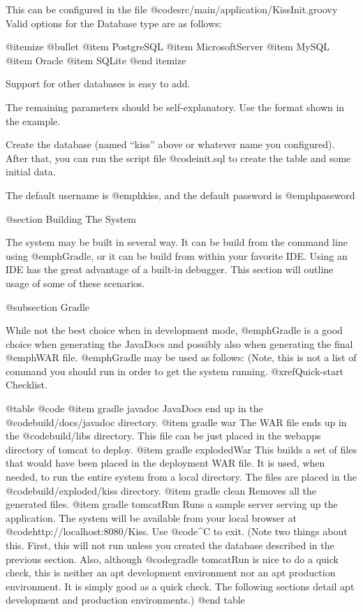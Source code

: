 This can be configured in the file @code{src/main/application/KissInit.groovy}
Valid options for the Database type are as follows:

@itemize @bullet
@item
PostgreSQL
@item
MicrosoftServer
@item
MySQL
@item
Oracle
@item
SQLite
@end itemize

Support for other databases is easy to add.

The remaining parameters should be self-explanatory.  Use the format shown in the example.

Create the database (named ``kiss'' above or whatever name you
configured).  After that, you can run the script file @code{init.sql}
to create the table and some initial data.

The default username is @emph{kiss}, and the default password is @emph{password}

@section Building The System

The system may be built in several way.  It can be build from the
command line using @emph{Gradle}, or it can be build from within your
favorite IDE.  Using an IDE has the great advantage of a built-in
debugger.  This section will outline usage of some of these scenarios.

@subsection Gradle 

While not the best choice when in development mode, @emph{Gradle} is a
good choice when generating the JavaDocs and possibly also when
generating the final @emph{WAR} file.  @emph{Gradle} may be used as follows:
(Note, this is not a list of command you should run in order to get the system running.  
@xref{Quick-start Checklist}.

@table @code
@item gradle javadoc
JavaDocs end up in the @code{build/docs/javadoc} directory.
@item gradle war
The WAR file ends up in the @code{build/libs} directory.  
This file can be just placed in the webapps directory of tomcat to deploy.
@item gradle explodedWar
This builds a set of files that would have been placed in the deployment WAR file.  It is used, when needed,
to run the entire system from a local directory.  The files are placed in the @code{build/exploded/kiss}
directory.
@item gradle clean
Removes all the generated files.
@item gradle tomcatRun
Runs a sample server serving up the application.  The system will be
available from your local browser at
@code{http://localhost:8080/Kiss}.  Use @code{^C} to exit.
(Note two things about this.  First, this will not run unless you created the database described in the previous section.
Also, although @code{gradle tomcatRun} is nice to do a quick check, this is neither an apt development environment nor
an apt production environment.  It is simply good as a quick check.  The following sections detail apt development and production environments.)  
@end table

